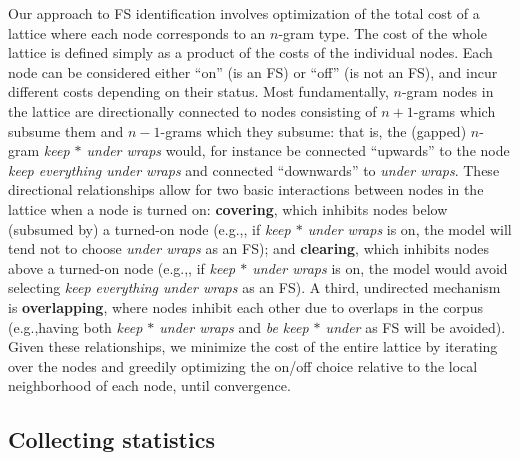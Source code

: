\documentclass[11pt,letterpaper]{article}
\makeatletter
\def \eg {e.g.,\@ }
\newcommand{\gap}{$*$\xspace}
\newcommand{\ex}[1]{\textit{#1}\xspace}
\newcommand{\termdef}[1]{\textbf{#1}\xspace}
\makeatother
\begin{document}
Our approach to FS identification involves optimization of the total cost of a lattice where each node corresponds to an $n$-gram type. The cost of the whole lattice is defined simply as a product of the costs of the individual nodes. Each node can be considered either ``on'' (is an FS) or ``off'' (is not an FS), and incur different costs depending on their status. Most fundamentally, $n$-gram nodes in the lattice are directionally connected to nodes consisting of $n+1$-grams which subsume them and $n-1$-grams which they subsume: that is, the (gapped) $n$-gram \ex{keep \gap under wraps} would, for instance be connected ``upwards'' to the node \ex{keep everything under wraps} and connected ``downwards'' to \ex{under wraps}. These directional relationships allow for two basic interactions between nodes in the lattice when a node is turned on: \termdef{covering}, which inhibits nodes below (subsumed by) a turned-on node (\eg, if \ex{keep \gap under wraps} is on, the model will tend not to choose \ex{under wraps} as an FS); and \termdef{clearing}, which inhibits nodes above a turned-on node (\eg, if \ex{keep \gap under wraps} is on, the model would avoid selecting \ex{keep everything under wraps} as an FS). A third, undirected mechanism is \termdef{overlapping}, where nodes inhibit each other due to overlaps in the corpus (\eg having both \ex{keep \gap under wraps} and \ex{be keep \gap under} as FS will be avoided). Given these relationships, we minimize the cost of the entire lattice by iterating over the nodes and greedily optimizing the on/off choice relative to the local neighborhood of each node, until convergence.

\subsection{Collecting statistics}
\end{document}
